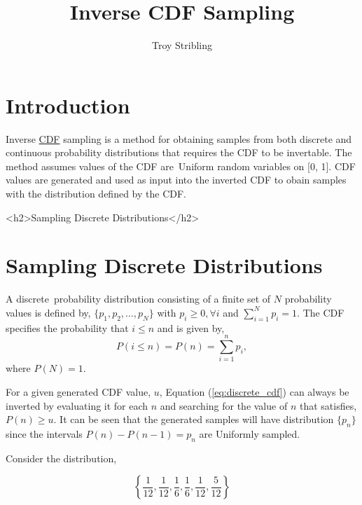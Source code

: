 \documentclass[12pt]{article}
\title{Inverse CDF Sampling}
\author{Troy Stribling}
\begin{document}
\iftex
\maketitle
\section{Introduction}
\fi

Inverse \href{https://en.wikipedia.org/wiki/Cumulative_distribution_function}{CDF} sampling is a method for obtaining samples
from both discrete and continuous probability distributions
that requires the CDF to be invertable. The method assumes values of the CDF are Uniform random variables on [0, 1].
CDF values are generated and used as input into the inverted CDF to obain samples with the distribution defined by the CDF.

\ifblog
<h2>Sampling Discrete Distributions</h2>
\fi
\iftex
\section{Sampling Discrete Distributions}
\fi

A discrete probability distribution consisting of a finite set of $N$ probability values is defined by,
$\{p_1, p_2,\ldots,p_N\}$ with $p_i \geq 0, \forall i$ and $\sum_{i=1}^N{p_i} = 1.$ The CDF specifies the probability
that $i \leq n$ and is given by,
\begin{equation}
\label{eq:discrete_cdf}
P(i \leq n)=P(n)=\sum_{i=1}^n{p_i},
\end{equation}
where $P(N)=1.$

For a given generated CDF value, $u$, Equation (\ref{eq:discrete_cdf}) can always be inverted by evaluating it for each $n$ and
searching for the value of $n$ that satisfies, $P(n) \geq u.$ It can be seen that the generated samples will have
distribution $\{p_n\}$ since the intervals $P(n)-P(n-1) = p_n$ are Uniformly sampled.

Consider the distribution,

\begin{equation} 
\left \{\frac{1}{12}, \frac{1}{12}, \frac{1}{6}, \frac{1}{6}, \frac{1}{12}, \frac{5}{12} \right\}
\label{eq:discrete}
\end{equation}
\end{document}
